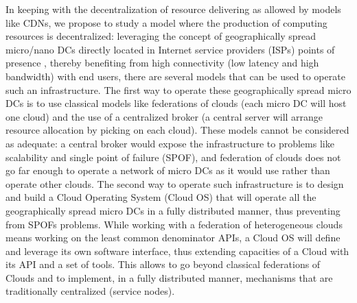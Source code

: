 In keeping with the decentralization of resource delivering as allowed by models
like CDNs, we propose to study a model where the production of computing 
resources is decentralized: leveraging the concept of geographically spread 
micro/nano DCs \cite{greenberg:2008} directly located in Internet service 
providers (ISPs) points of presence \cite{lebre:beyond2013}, thereby benefiting 
from high connectivity (low latency and high bandwidth) with end users, there 
are several models that can be used to operate such an infrastructure. The first 
way to operate these geographically spread micro DCs is to use classical models 
like federations of clouds (each micro DC will host one cloud) and the use of a
centralized broker (a central server will arrange resource allocation by picking
on each cloud). These models cannot be considered as adequate: a central broker 
would expose the infrastructure to problems like scalability and single point of
failure (SPOF), and federation of clouds does not go far enough to operate a 
network of micro DCs as it would use rather than operate other clouds. The 
second way to operate such infrastructure is to design and build a Cloud 
Operating System (Cloud OS) that will operate all the geographically spread 
micro DCs in a fully distributed manner, thus preventing from SPOFs problems.
While working with a federation of heterogeneous clouds means working on the 
least common denominator APIs, a Cloud OS will define and leverage its own 
software interface, thus extending capacities of a Cloud with its API and a set 
of tools. This allows to go beyond classical federations of Clouds and to 
implement, in a fully distributed manner, mechanisms that are traditionally 
centralized (service nodes).


